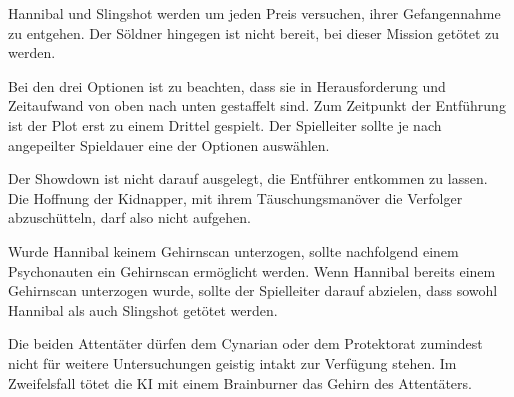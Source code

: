 Hannibal und Slingshot werden um jeden Preis versuchen, ihrer Gefangennahme zu entgehen. Der Söldner hingegen ist nicht bereit, bei dieser Mission getötet zu werden.
\vfill



\begin{remarks}
	Bei den drei Optionen ist zu beachten, dass sie in Herausforderung und Zeitaufwand von oben nach unten gestaffelt sind. Zum Zeitpunkt der Entführung ist der Plot erst zu einem Drittel gespielt. Der Spielleiter sollte je nach angepeilter Spieldauer eine der Optionen auswählen.

	Der Showdown ist nicht darauf ausgelegt, die Entführer entkommen zu lassen. Die Hoffnung der Kidnapper, mit ihrem Täuschungsmanöver die Verfolger abzuschütteln, darf also nicht aufgehen.
	
	Wurde Hannibal keinem Gehirnscan unterzogen, sollte nachfolgend einem Psychonauten ein Gehirnscan ermöglicht werden. Wenn Hannibal bereits einem Gehirnscan unterzogen wurde, sollte der Spielleiter darauf abzielen, dass sowohl Hannibal als auch Slingshot getötet werden.
	
	Die beiden Attentäter dürfen dem Cynarian oder dem Protektorat zumindest nicht für weitere Untersuchungen geistig intakt zur Verfügung stehen. Im Zweifelsfall tötet die KI mit einem Brainburner das Gehirn des Attentäters.
\end{remarks}
